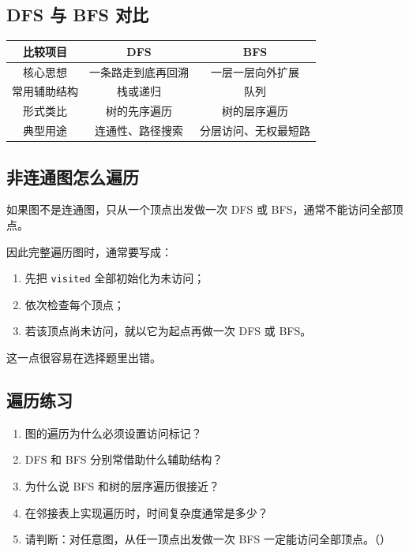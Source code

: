 \documentclass{../../note}
\begin{document}
\subsection{DFS 与 BFS 对比}

\begin{center}
\begin{tabular}{|c|c|c|}
\hline
比较项目 & DFS & BFS \\
\hline
核心思想 & 一条路走到底再回溯 & 一层一层向外扩展 \\
\hline
常用辅助结构 & 栈或递归 & 队列 \\
\hline
形式类比 & 树的先序遍历 & 树的层序遍历 \\
\hline
典型用途 & 连通性、路径搜索 & 分层访问、无权最短路 \\
\hline
\end{tabular}
\end{center}

\subsection{非连通图怎么遍历}

如果图不是连通图，只从一个顶点出发做一次 DFS 或 BFS，通常不能访问全部顶点。

因此完整遍历图时，通常要写成：

\begin{enumerate}
  \item 先把 \texttt{visited} 全部初始化为未访问；
  \item 依次检查每个顶点；
  \item 若该顶点尚未访问，就以它为起点再做一次 DFS 或 BFS。
\end{enumerate}

这一点很容易在选择题里出错。

\subsection{遍历练习}

\begin{enumerate}
  \item 图的遍历为什么必须设置访问标记？
  \item DFS 和 BFS 分别常借助什么辅助结构？
  \item 为什么说 BFS 和树的层序遍历很接近？
  \item 在邻接表上实现遍历时，时间复杂度通常是多少？
  \item 请判断：对任意图，从任一顶点出发做一次 BFS 一定能访问全部顶点。（\hspace{1cm}）
\end{enumerate}
\end{document}
